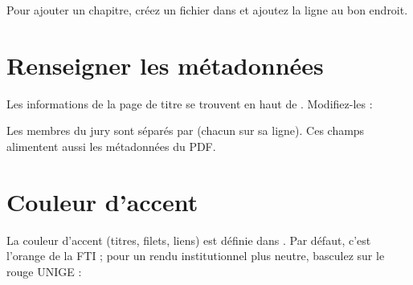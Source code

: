 \begin{latexcode}



\end{latexcode}

Pour ajouter un chapitre, créez un fichier dans  et
ajoutez la ligne \code{} au bon endroit.

\section{Renseigner les métadonnées}

Les informations de la page de titre se trouvent en haut de
. Modifiez-les :

\begin{latexcode}
\newcommand{\ThesisTitle}{Titre de la thèse}
\newcommand{\ThesisSubtitle}{Sous-titre éventuel}
\newcommand{\ThesisAuthor}{Prénom \textsc{Nom}}
\newcommand{\ThesisDegree}{docteur·e en traitement informatique multilingue}
\newcommand{\ThesisSupervisor}{Prof. Prénom \textsc{Nom}}
\newcommand{\ThesisJury}{Prof. A. \textsc{Un}, Université de Genève\\%
                         Prof. B. \textsc{Deux}, University of Stuttgart
                         }
\newcommand{\ThesisPlace}{Genève}
\newcommand{\ThesisDate}{2026}
\end{latexcode}

\noindent Les membres du jury sont séparés par \code{\\} (chacun sur sa
ligne). Ces champs alimentent aussi les métadonnées du PDF.

\section{Couleur d'accent}

La couleur d'accent (titres, filets, liens) est définie dans
. Par défaut, c'est l'orange de la FTI ; pour
un rendu institutionnel plus neutre, basculez sur le rouge UNIGE :

